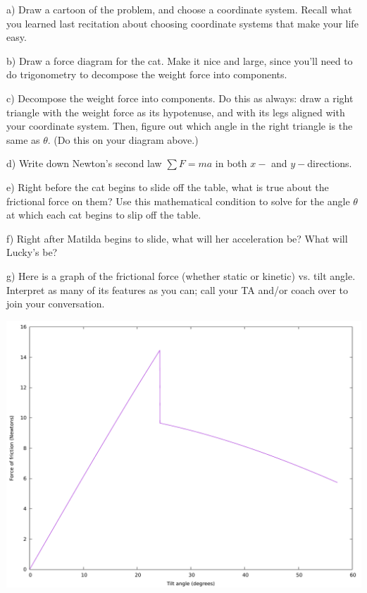 \documentclass[12pt]{article}
\begin{document}
{a) Draw a cartoon of the problem, and choose a coordinate system. Recall what you learned last recitation about choosing
coordinate systems that make your life easy.

\vspace{2in}
\newpage

b) Draw a force diagram for the cat. Make it nice and large, since you'll need to do trigonometry to decompose the 
weight force into components.

\vspace{3in}


c) Decompose the weight force into components. Do this as always: draw a right triangle with the weight force as its 
hypotenuse, and with its legs aligned with your coordinate system. Then, figure out which angle in the right triangle
is the same as $\theta$. (Do this on your diagram above.)

d) Write down Newton's second law $\sum F = ma$ in both $x-$ and $y-$directions. 

\vspace{2in}

e) Right before the cat begins to slide off the table, what is true about the frictional force on them? Use this 
mathematical condition to solve for the angle $\theta$ at which each cat begins to slip off the table.

\vspace{2in}
\newpage
f) Right after Matilda begins to slide, what will her acceleration be? What will Lucky's be?

\vspace{3in}

g) Here is a graph of the frictional force (whether static or kinetic) vs. tilt angle. Interpret as many of its features as you
can; call your TA and/or coach over to join your conversation.

\begin{center}
\includegraphics[width=.9\textwidth]{tilt.pdf}
\end{center}

}
\end{document}
